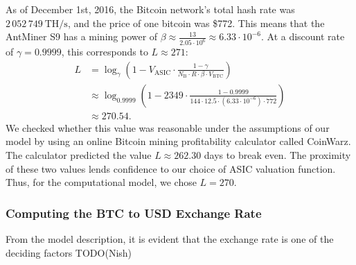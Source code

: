 \documentclass[12pt]{article}
\newcommand*{\BlkReward}{{R}}
\newcommand*{\ExchgRate}{{V_{\mathrm{BTC}}}}
\newcommand*{\AsicValue}{{V_{\mathrm{ASIC}}}}
\newcommand*{\BlocksPerPeriod}{{N_{\mathrm{B}}}}
\newcommand*{\THs}{\ \mathrm{TH/s}}
\begin{document}
As of December 1st, 2016, the Bitcoin network's total hash rate was $2\,052\,749 \THs$, and the price of one bitcoin was \$772.\cite{hashrate, btcprice}
This means that the AntMiner S9 has a mining power of $\beta \approx \frac{13}{2.05\cdot 10^6} \approx 6.33 \cdot 10^{-6}$.
At a discount rate of $\gamma = 0.9999$, this corresponds to $L \approx 271$:
\begin{align*}
  L & = \log_{\gamma} \left(
    1 - \AsicValue \cdot \frac{1 - \gamma}{\BlocksPerPeriod \cdot \BlkReward \cdot \beta \cdot \ExchgRate}
  \right) \\
  & \approx \log_{0.9999} \left(
    1 - 2349 \cdot \frac{1 - 0.9999}{144 \cdot 12.5 \cdot (6.33 \cdot 10^{-6}) \cdot 772}
  \right) \\
  & \approx 270.54.
\end{align*}
We checked whether this value was reasonable under the assumptions of our model by using an online Bitcoin mining profitability calculator called CoinWarz.
The calculator predicted the value $L \approx 262.30$ days to break even.\cite{coinwarz, difficultychart}
The proximity of these two values lends confidence to our choice of ASIC valuation function.
Thus, for the computational model, we chose $L = 270$.

\subsubsection{Computing the BTC to USD Exchange Rate}

From the model description, it is evident that the exchange rate is one of the deciding factors
TODO(Nish)
\end{document}
